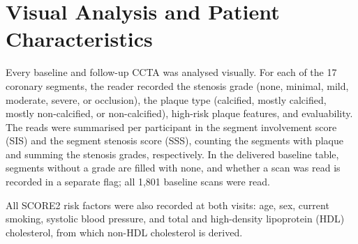 \section{Visual Analysis and Patient Characteristics}
\label{sec:data-plaque-location}

Every baseline and follow-up CCTA was analysed visually.
For each of the 17 coronary segments, the reader recorded the stenosis grade (none, minimal, mild, moderate, severe, or occlusion), the plaque type (calcified, mostly calcified, mostly non-calcified, or non-calcified), high-risk plaque features, and evaluability.
The reads were summarised per participant in the segment involvement score (SIS) and the segment stenosis score (SSS), counting the segments with plaque and summing the stenosis grades, respectively.
In the delivered baseline table, segments without a grade are filled with none, and whether a scan was read is recorded in a separate flag; all 1,801 baseline scans were read.

All SCORE2 risk factors \cite{score2_2021} were also recorded at both visits: age, sex, current smoking, systolic blood pressure, and total and high-density lipoprotein (HDL) cholesterol, from which non-HDL cholesterol is derived.
